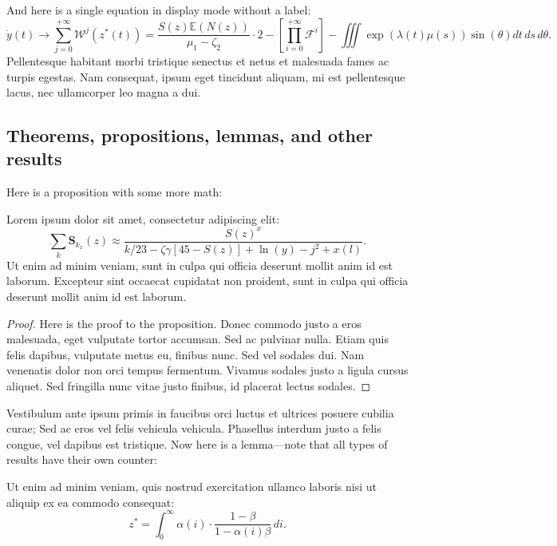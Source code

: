 \documentclass[letterpaper,11pt,leqno]{article}
\begin{document}
And here is a single equation in display mode without a label:
\begin{equation*}
\dot{y}(t) \to \sum_{j=0}^{+\infty}\mathcal{W}^j(z^{\ast}(t)) = \frac{S(z) \mathbb{E}(N(z))}{\mu_1 - \zeta_2} \cdot 2 - \left[\prod_{i=0}^{+\infty}\mathcal{F}^{i}\right]-\iiint\exp(\lambda(t) \mu(s)) \sin(\theta)dt\,ds\,d\theta.
\end{equation*}
Pellentesque habitant morbi tristique senectus et netus et malesuada fames ac turpis egestas. Nam consequat, ipsum eget tincidunt aliquam, mi est pellentesque lacus, nec ullamcorper leo magna a dui.

\subsection{Theorems, propositions, lemmas, and other results}

Here is a proposition with some more math:   
\begin{proposition}
Lorem ipsum dolor sit amet, consectetur adipiscing elit:
\begin{equation}
\sum_k\bm{S}_{k_x}(z) \approx \frac{S(z)^x}{k / 23 -\zeta\gamma [45- S(z)] + \ln(y) - j^2+x(l)}.
\label{e:type1}\end{equation}
Ut enim ad minim veniam, sunt in culpa qui officia deserunt mollit anim id est laborum. Excepteur sint occaecat cupidatat non proident, sunt in culpa qui officia deserunt mollit anim id est laborum.
\label{p:type1}\end{proposition}
\begin{proof} 
Here is the proof to the proposition. Donec commodo justo a eros malesuada, eget vulputate tortor accumsan. Sed ac pulvinar nulla. Etiam quis felis dapibus, vulputate metus eu, finibus nunc. Sed vel sodales dui. Nam venenatis dolor non orci tempus fermentum. Vivamus sodales justo a ligula cursus aliquet. Sed fringilla nunc vitae justo finibus, id placerat lectus sodales.
\end{proof} 

Vestibulum ante ipsum primis in faucibus orci luctus et ultrices posuere cubilia curae; Sed ac eros vel felis vehicula vehicula. Phasellus interdum justo a felis congue, vel dapibus est tristique. Now here is a lemma---note that all types of results have their own counter:
\begin{lemma} 
Ut enim ad minim veniam, quis nostrud exercitation ullamco laboris nisi ut aliquip ex ea commodo consequat:
\begin{equation}
z^* = \int_{0}^{\infty} \alpha(i) \cdot \frac{1-\beta}{1-\alpha(i)\beta}\,di.
\label{e:cv}\end{equation}
\label{p:cv}\end{lemma}
\end{document}
